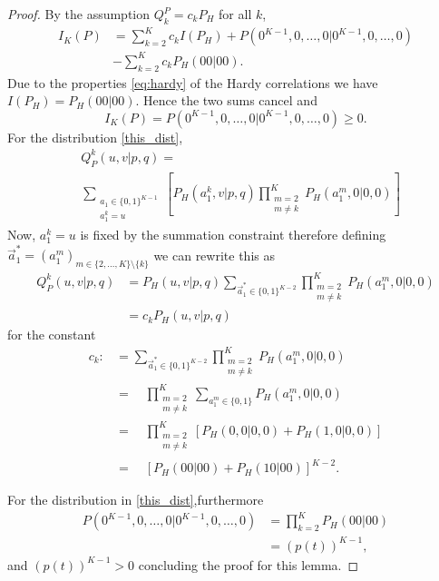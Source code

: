 \documentclass[pra,aps,reprint,superscriptaddress]{revtex4-2}
\theoremstyle{theorem}
\begin{document}
\begin{proof}
    By the assumption $Q_k^P=c_k P_H$ for all $k$,
\begin{align}\nonumber
I_K(P)&=\sum_{k=2}^K c_k I(P_H)+P(0^{K-1},0,\ldots,0|0^{K-1},0,\ldots,0)\\&-\sum_{k=2}^K c_k P_H(00|00).
\end{align}
Due to the properties \eqref{eq:hardy} of the Hardy correlations we have $I(P_H)=P_H(00|00)$. Hence the two sums cancel and
\begin{equation}
I_K(P)=P(0^{K-1},0,\ldots,0|0^{K-1},0,\ldots,0)\geq 0.
\end{equation}
For the distribution \eqref{this_dist}, 
\begin{align}
    &Q^k_P(u,v|p,q) =\\& \sum_{\substack{a_1\in\{0,1\}^{K-1}\\a_1^k=u}}\left[P_H(a^k_1,v|p,q)\prod^K_{\substack{m=2\\m\neq k}}P_H(a_1^m,0|0,0)\right]\nonumber
\end{align}
Now, $a^k_1=u$ is fixed by the summation constraint therefore defining $\vec a^*_1=(a_1^m)_{m\in\{2,...,K\}\setminus \{k\}}$ we can rewrite this as
\begin{align}
    Q^k_P(u,v|p,q) &=P_H(u,v|p,q) \! \! \! \! \! \!\sum_{\vec a_1^*\in\{0,1\}^{K-2}}\prod^K_{\substack{m=2\\m\neq k}}P_H(a_1^m,0|0,0)\nonumber \\
    &= c_k P_H(u,v|p,q)
\end{align}
for the constant 
\begin{align}
    c_k :&= \sum_{\vec a_1^*\in\{0,1\}^{K-2}}\prod^K_{\substack{m=2\\m\neq k}}P_H(a_1^m,0|0,0) \\
    &= \quad \prod^K_{\substack{m=2\\m\neq k}}\sum_{a_1^m\in\{0,1\}}P_H(a_1^m,0|0,0)\\
    &= \quad \prod^K_{\substack{m=2\\m\neq k}}\left[P_H(0,0|0,0)+P_H(1,0|0,0)\right] \\
    &= \quad \left[P_H(00|00)+P_H(10|00)\right]^{K-2}.
\end{align}

For the distribution in \eqref{this_dist},furthermore
\begin{align}
P(0^{K-1},0,\ldots,0|0^{K-1},0,\ldots,0) &=  \prod_{k=2}^KP_H(00|00) \nonumber \\
&=(p(t))^{K-1}, \nonumber
\end{align}
and $(p(t))^{K-1}>0$ concluding the proof for this lemma.
\end{proof}
\end{document}
